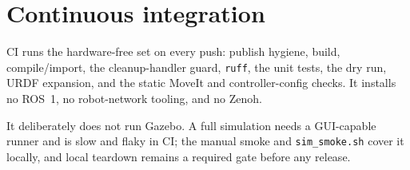 \section{Continuous integration}

CI runs the hardware-free set on every push: publish hygiene, build,
compile/import, the cleanup-handler guard, \texttt{ruff}, the unit tests, the
dry run, URDF expansion, and the static MoveIt and controller-config checks. It
installs no ROS~1, no robot-network tooling, and no Zenoh.

It deliberately does not run Gazebo. A full simulation needs a GUI-capable runner
and is slow and flaky in CI; the manual smoke and \texttt{sim\_smoke.sh} cover it
locally, and local teardown remains a required gate before any release.
